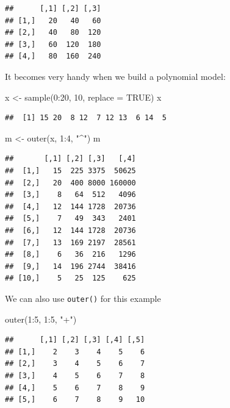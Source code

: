 \documentclass[
]{book}
\newenvironment{Shaded}{\begin{snugshade}}{\end{snugshade}}
\newcommand{\AttributeTok}[1]{\textcolor[rgb]{0.77,0.63,0.00}{#1}}
\newcommand{\ConstantTok}[1]{\textcolor[rgb]{0.00,0.00,0.00}{#1}}
\newcommand{\DecValTok}[1]{\textcolor[rgb]{0.00,0.00,0.81}{#1}}
\newcommand{\FunctionTok}[1]{\textcolor[rgb]{0.00,0.00,0.00}{#1}}
\newcommand{\NormalTok}[1]{#1}
\newcommand{\OtherTok}[1]{\textcolor[rgb]{0.56,0.35,0.01}{#1}}
\newcommand{\SpecialCharTok}[1]{\textcolor[rgb]{0.00,0.00,0.00}{#1}}
\newcommand{\StringTok}[1]{\textcolor[rgb]{0.31,0.60,0.02}{#1}}
\begin{document}
\begin{verbatim}
##      [,1] [,2] [,3]
## [1,]   20   40   60
## [2,]   40   80  120
## [3,]   60  120  180
## [4,]   80  160  240
\end{verbatim}

It becomes very handy when we build a polynomial model:

\begin{Shaded}
\begin{Highlighting}[]
\NormalTok{x }\OtherTok{\textless{}{-}} \FunctionTok{sample}\NormalTok{(}\DecValTok{0}\SpecialCharTok{:}\DecValTok{20}\NormalTok{, }\DecValTok{10}\NormalTok{, }\AttributeTok{replace =} \ConstantTok{TRUE}\NormalTok{)}
\NormalTok{x}
\end{Highlighting}
\end{Shaded}

\begin{verbatim}
##  [1] 15 20  8 12  7 12 13  6 14  5
\end{verbatim}

\begin{Shaded}
\begin{Highlighting}[]
\NormalTok{m }\OtherTok{\textless{}{-}} \FunctionTok{outer}\NormalTok{(x, }\DecValTok{1}\SpecialCharTok{:}\DecValTok{4}\NormalTok{, }\StringTok{"\^{}"}\NormalTok{)}
\NormalTok{m}
\end{Highlighting}
\end{Shaded}

\begin{verbatim}
##       [,1] [,2] [,3]   [,4]
##  [1,]   15  225 3375  50625
##  [2,]   20  400 8000 160000
##  [3,]    8   64  512   4096
##  [4,]   12  144 1728  20736
##  [5,]    7   49  343   2401
##  [6,]   12  144 1728  20736
##  [7,]   13  169 2197  28561
##  [8,]    6   36  216   1296
##  [9,]   14  196 2744  38416
## [10,]    5   25  125    625
\end{verbatim}

We can also use \texttt{outer()} for this example

\begin{Shaded}
\begin{Highlighting}[]
\FunctionTok{outer}\NormalTok{(}\DecValTok{1}\SpecialCharTok{:}\DecValTok{5}\NormalTok{, }\DecValTok{1}\SpecialCharTok{:}\DecValTok{5}\NormalTok{, }\StringTok{"+"}\NormalTok{)}
\end{Highlighting}
\end{Shaded}

\begin{verbatim}
##      [,1] [,2] [,3] [,4] [,5]
## [1,]    2    3    4    5    6
## [2,]    3    4    5    6    7
## [3,]    4    5    6    7    8
## [4,]    5    6    7    8    9
## [5,]    6    7    8    9   10
\end{verbatim}
\end{document}
